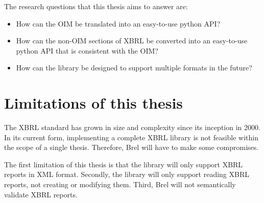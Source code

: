 The research questions that this thesis aims to answer are:


\begin{itemize}
    \item \textbf{} How can the OIM be translated into an easy-to-use python API?
    \item \textbf{} How can the non-OIM sections of XBRL be converted into an easy-to-use python API that is consistent with the OIM?
    \item \textbf{} How can the library be designed to support multiple formats in the future?
\end{itemize}

\section{Limitations of this thesis}
\label{sec:limitations}

The XBRL standard has grown in size and complexity since its inception in 2000.
In its current form, implementing a complete XBRL library is not feasible within the scope of a single thesis.
Therefore, Brel will have to make some compromises.

The first limitation of this thesis is that the library will only support XBRL reports in XML format.
Secondly, the library will only support reading XBRL reports, not creating or modifying them.
Third, Brel will not semantically validate XBRL reports.

